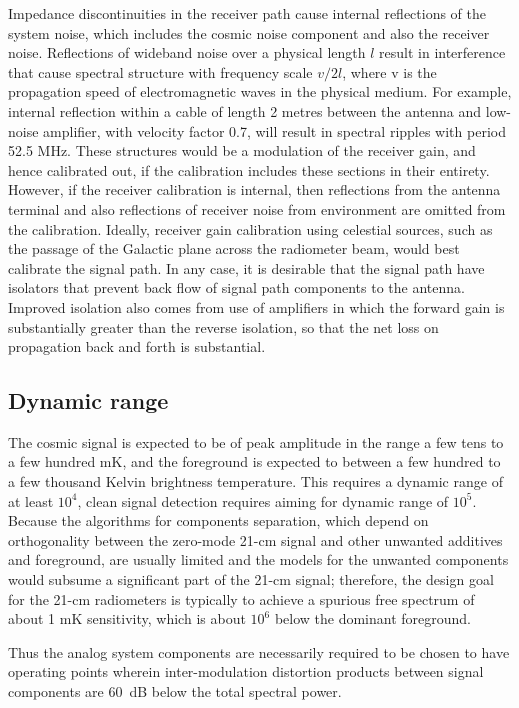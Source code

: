   Impedance discontinuities in the receiver path cause internal reflections of the system noise, which includes the cosmic noise component and also the receiver noise.  Reflections of wideband noise over a physical length $l$ result in interference that cause spectral structure with frequency scale $v/2l$, where v is the propagation speed of electromagnetic waves in the physical medium.  For example, internal reflection within a cable of length 2 metres between the antenna and low-noise amplifier, with velocity factor 0.7, will result in spectral ripples with period 52.5 MHz. These structures would be a modulation of the receiver gain, and hence calibrated out, if the calibration includes these sections in their entirety.  However, if the receiver calibration is internal, then reflections from the antenna terminal and also reflections of receiver noise from environment are omitted from the calibration.  Ideally, receiver gain calibration using celestial sources, such as the passage of the Galactic plane across the radiometer beam, would best calibrate the signal path.  In any case, it is desirable that the signal path have isolators that prevent back flow of signal path components to the antenna.  Improved isolation also comes from use of amplifiers in which the forward gain is substantially greater than the reverse isolation, so that the net loss on propagation back and forth is substantial.
  
\subsection{Dynamic range}
  
  The cosmic signal is expected to be of peak amplitude in the range a few tens to a few hundred mK, and the foreground is expected to between a few hundred to a few thousand Kelvin brightness temperature.  This requires a dynamic range of at least $10^4$, clean signal detection requires aiming for dynamic range of $10^5$.  Because the algorithms for components separation, which depend on orthogonality between the zero-mode 21-cm signal and other unwanted additives and foreground, are usually limited and the models for the unwanted components would subsume a significant part of the 21-cm signal; therefore, the design goal for the 21-cm radiometers is typically to achieve a spurious free spectrum of about 1 mK sensitivity, which is about $10^6$ below the dominant foreground.
  
  Thus the analog system components are necessarily required to be chosen to have operating points wherein inter-modulation distortion products between signal components are 60~dB below the total spectral power.
  
